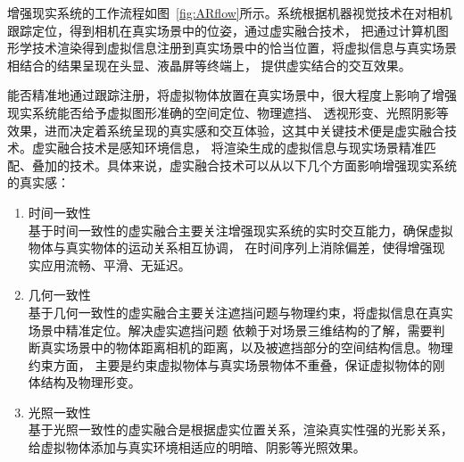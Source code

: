 增强现实系统的工作流程如图~\ref{fig:ARflow}所示。系统根据机器视觉技术在对相机跟踪定位，得到相机在真实场景中的位姿，通过虚实融合技术，
把通过计算机图形学技术渲染得到虚拟信息注册到真实场景中的恰当位置，将虚拟信息与真实场景相结合的结果呈现在头显、液晶屏等终端上，
提供虚实结合的交互效果。

能否精准地通过跟踪注册，将虚拟物体放置在真实场景中，很大程度上影响了增强现实系统能否给予虚拟图形准确的空间定位、物理遮挡、
透视形变、光照阴影等效果，进而决定着系统呈现的真实感和交互体验，这其中关键技术便是虚实融合技术。虚实融合技术是感知环境信息，
将渲染生成的虚拟信息与现实场景精准匹配、叠加的技术。具体来说，虚实融合技术可以从以下几个方面影响增强现实系统的真实感：

{
\setlist[enumerate]{}%
\begin{enumerate}[nosep]
    \item 时间一致性\\基于时间一致性的虚实融合主要关注增强现实系统的实时交互能力，确保虚拟物体与真实物体的运动关系相互协调，
    在时间序列上消除偏差，使得增强现实应用流畅、平滑、无延迟。
    \item 几何一致性\\基于几何一致性的虚实融合主要关注遮挡问题与物理约束，将虚拟信息在真实场景中精准定位。解决虚实遮挡问题
    依赖于对场景三维结构的了解，需要判断真实场景中的物体距离相机的距离，以及被遮挡部分的空间结构信息。物理约束方面，
    主要是约束虚拟物体与真实场景物体不重叠，保证虚拟物体的刚体结构及物理形变。
    \item 光照一致性\\基于光照一致性的虚实融合是根据虚实位置关系，渲染真实性强的光影关系，给虚拟物体添加与真实环境相适应的明暗、阴影等光照效果。
\end{enumerate}
}

